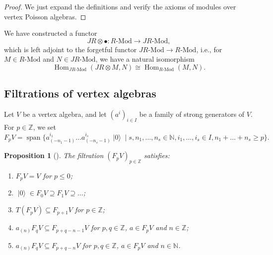 \documentclass[a4paper, 12pt, reqno]{amsart}
\newtheorem{proposition}[theorem]{Proposition}
\theoremstyle{remark}
\DeclareMathOperator{\vspan}{span}
\DeclareMathOperator{\vac}{|0\rangle}
\DeclareMathOperator{\Hom}{Hom}
\begin{document}
\begin{proof}
  We just expand the definitions and verify the axioms of modules over vertex Poisson algebras.
\end{proof}

We have constructed a functor
\begin{equation*}
  JR\otimes\bullet: \text{$R$-Mod} \to \text{$JR$-Mod},
\end{equation*}
which is left adjoint to the forgetful functor $\text{$JR$-Mod} \to \text{$R$-Mod}$, i.e., for $M \in \text{$R$-Mod}$ and $N \in \text{$JR$-Mod}$, we have a natural isomorphism
\begin{equation*}
  \Hom_{\text{$JR$-Mod}}(JR \otimes M, N) \cong \Hom_{\text{$R$-Mod}}(M, N).
\end{equation*}

\subsection{Filtrations of vertex algebras}
\label{sec:filtr-vert-algebr}

Let $V$ be a vertex algebra, and let $(a^i)_{i \in I}$ be a family of strong generators of $V$.
For $p \in \mathbb{Z}$, we set
\begin{equation*}
  F_pV = \vspan\{a^{i_1}_{(-n_1 - 1)}\dots a^{i_s}_{(-n_s - 1)}\vac \mid s, n_1, \dots, n_s \in \mathbb{N}, i_1, \dots, i_s \in I, n_1 + \dots + n_s \ge p\}.
\end{equation*}

\begin{proposition}[{\cite{li_abelianizing_2005}}]
  \label{prp:13}
  The filtration $(F_pV)_{p \in \mathbb{Z}}$ satisfies:
  \begin{enumerate}
  \item $F_pV = V$ for $p \le 0$;
  \item $\vac \in F_0V \supseteq F_1V \supseteq \dots$;
  \item $T(F_pV) \subseteq F_{p + 1}V$ for $p \in \mathbb{Z}$;
  \item $a_{(n)}F_qV \subseteq F_{p + q - n - 1}V$ for $p, q \in \mathbb{Z}$, $a \in F_pV$ and $n \in \mathbb{Z}$;
  \item $a_{(n)}F_qV \subseteq F_{p + q - n}V$ for $p, q \in \mathbb{Z}$, $a \in F_pV$ and $n \in \mathbb{N}$.
  \end{enumerate}
\end{proposition}
\end{document}
